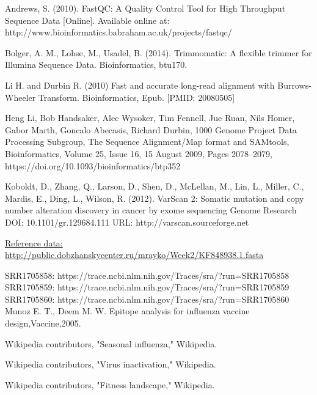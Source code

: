 \documentclass{article}
\begin{document}
\begin{thebibliography}{9}
Andrews, S. (2010). FastQC:  A Quality Control Tool for High Throughput Sequence Data [Online]. Available online at: http://www.bioinformatics.babraham.ac.uk/projects/fastqc/

Bolger, A. M., Lohse, M., Usadel, B. (2014). Trimmomatic: A flexible trimmer for Illumina Sequence Data. Bioinformatics, btu170.

Li H. and Durbin R. (2010) Fast and accurate long-read alignment with Burrows-Wheeler Transform. Bioinformatics, Epub. [PMID: 20080505] 

Heng Li, Bob Handsaker, Alec Wysoker, Tim Fennell, Jue Ruan, Nils Homer, Gabor Marth, Goncalo Abecasis, Richard Durbin, 1000 Genome Project Data Processing Subgroup, The Sequence Alignment/Map format and SAMtools, Bioinformatics, Volume 25, Issue 16, 15 August 2009, Pages 2078–2079, https://doi.org/10.1093/bioinformatics/btp352

Koboldt, D., Zhang, Q., Larson, D., Shen, D., McLellan, M., Lin, L., Miller, C., Mardis, E., Ding, L., Wilson, R. (2012). VarScan 2: Somatic mutation and copy number alteration discovery in cancer by exome sequencing Genome Research DOI: 10.1101/gr.129684.111
URL: http://varscan.sourceforge.net 
 
\href{http://public.dobzhanskycenter.ru/mrayko/Week2/KF848938.1.fasta}{Reference data: http://public.dobzhanskycenter.ru/mrayko/Week2/KF848938.1.fasta}
 
SRR1705858: https://trace.ncbi.nlm.nih.gov/Traces/sra/?run=SRR1705858 \\
SRR1705859: https://trace.ncbi.nlm.nih.gov/Traces/sra/?run=SRR1705859 \\
SRR1705860: https://trace.ncbi.nlm.nih.gov/Traces/sra/?run=SRR1705860 \\
  
Munoz E. T., Deem M. W. Epitope analysis for influenza vaccine design,Vaccine,2005.

 Wikipedia contributors, "Seasonal influenza," Wikipedia. 
 
Wikipedia contributors, "Virus inactivation," Wikipedia. 
 
Wikipedia contributors, "Fitness landscape," Wikipedia. 

\end{thebibliography}
\end{document}
